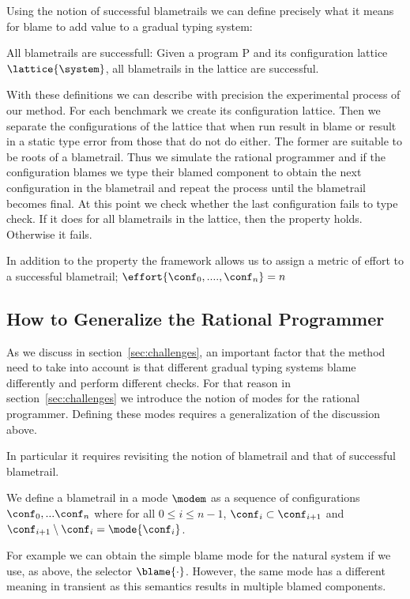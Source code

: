 Using the notion of successful blametrails we can define precisely what it
means for blame to add value to a gradual typing system: 

All blametrails are successfull: Given a program P and its configuration
lattice $\lattice{\system}$, all blametrails in the lattice are successful. 

With these definitions we can describe with precision the experimental
process of our method. For each benchmark we create its configuration
lattice. Then we separate the configurations of the lattice that 
when run result in blame or result in a static type error from  those that do not
do either. The former are 
suitable to be roots of a blametrail. Thus we simulate the rational 
programmer and if the configuration blames we type their blamed component to obtain the next
configuration in the blametrail and repeat the process until the
blametrail becomes final. At this point we check whether the last
configuration fails to type check. If it does for all blametrails in the
lattice, then the property holds. Otherwise it fails. 

In addition to the property the framework allows us to assign a metric of
effort to a successful blametrail; $\effort{\conf_0, ...., \conf_n} = n$ 

\subsection{How to Generalize the Rational Programmer} 

As we discuss in section~\ref{sec:challenges}, an important factor that the method need to
take into account is that different gradual typing systems blame
differently and perform different checks. For that reason in
section~\ref{sec:challenges} we introduce the notion of modes for the
rational programmer. Defining these modes requires a generalization of the 
discussion above. 

In particular it requires revisiting the notion of blametrail and that of
successful blametrail. 

We define a blametrail in a mode  $\modem$ as  
a sequence of configurations $\conf_0,...\conf_n$ where 
for all $0 \leq i \leq n - 1$, $\conf_i \subset \conf_{i+1}$ and
$\conf_{i+1} \setminus \conf_i = \mode{\conf_i}$.

   For example we can obtain the simple blame mode
for the natural system if we use, as above, the selector $\blame{\cdot}$. 
However, the same mode has a different meaning in transient as this
semantics results in multiple blamed components. 

